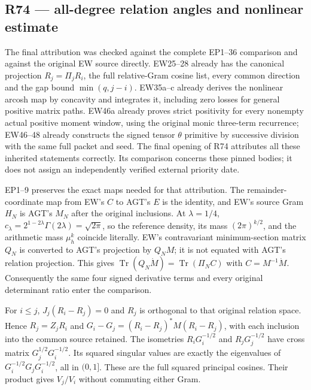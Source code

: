 \subsection{R74 --- all-degree relation angles and nonlinear
estimate}\label{r74-all-degree-relation-angles-and-nonlinear-estimate}

The final attribution was checked against the complete EP1--36
comparison and against the original EW source directly. EW25--28 already
has the canonical projection \(R_j=\Pi_jR_i\), the full relative-Gram
cosine list, every common direction and the gap bound \(\min(q,j-i)\).
EW35a--c already derives the nonlinear arcosh map by concavity and
integrates it, including zero losses for general positive matrix paths.
EW46a already proves strict positivity for every nonempty actual
positive moment window, using the original monic three-term recurrence;
EW46--48 already constructs the signed tensor \(\theta\) primitive by
successive division with the same full packet and seed. The final
opening of R74 attributes all these inherited statements correctly. Its
comparison concerns these pinned bodies; it does not assign an
independently verified external priority date.

EP1--9 preserves the exact maps needed for that attribution. The
remainder-coordinate map from EW's \(C\) to AGT's \(E\) is the identity,
and EW's source Gram \(H_N\) is AGT's \(M_N\) after the original
inclusions. At \(\lambda=1/4\),
\(c_\lambda=2^{1-2\lambda}\Gamma(2\lambda)=\sqrt{2\pi}\), so the
reference density, its mass \((2\pi)^{k/2}\), and the arithmetic mass
\(\mu_h^k\) coincide literally. EW's contravariant minimum-section
matrix \(Q_N\) is converted to AGT's projection by \(Q_NM\); it is not
equated with AGT's relation projection. This gives
\(\operatorname{Tr}(Q_N\dot M)=\operatorname{Tr}(\Pi_NC)\) with
\(C=M^{-1}\dot M\). Consequently the same four signed derivative terms
and every original determinant ratio enter the comparison.

For \(i\leq j\), \(J_j(R_i-R_j)=0\) and \(R_j\) is orthogonal to that
original relation space. Hence \(R_j=Z_jR_i\) and
\(G_i-G_j=(R_i-R_j)^*M(R_i-R_j)\), with each inclusion into the common
source retained. The isometries \(R_iG_i^{-1/2}\) and \(R_jG_j^{-1/2}\)
have cross matrix \(G_j^{1/2}G_i^{-1/2}\). Its squared singular values
are exactly the eigenvalues of \(G_i^{-1/2}G_jG_i^{-1/2}\), all in
\((0,1]\). These are the full squared principal cosines. Their product
gives \(V_j/V_i\) without commuting either Gram.

